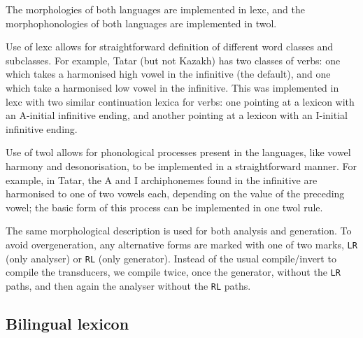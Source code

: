\documentclass[11pt]{article}
\begin{document}
The morphologies of both languages are implemented in lexc, and the morphophonologies of both languages are implemented in twol.

Use of lexc allows for straightforward definition of different word classes and subclasses.  For example, Tatar (but not Kazakh) has two classes of verbs: one which takes a harmonised high vowel in the infinitive (the default), and one which take a harmonised low vowel in the infinitive.  This was implemented in lexc with two similar continuation lexica for verbs: one pointing at a lexicon with an A-initial infinitive ending, and another pointing at a lexicon with an I-initial infinitive ending.

Use of twol allows for phonological processes present in the languages, like vowel harmony and desonorisation, to be implemented in a straightforward manner.  For example, in Tatar, the A and I archiphonemes found in the infinitive are harmonised to one of two vowels each, depending on the value of the preceding vowel; the basic form of this process can be implemented in one twol rule.

The same morphological description is used for both analysis and generation. To avoid overgeneration, any alternative forms are 
marked with one of two marks, {\tt {\small LR}} (only analyser) or {\tt {\small RL}} (only generator). Instead of the usual
compile/invert to compile the transducers, we compile twice, once the generator, without the {\tt {\small LR}} paths, and
then again the analyser without the {\tt {\small RL}} paths. 

\subsection{Bilingual lexicon}

	
\end{document}
